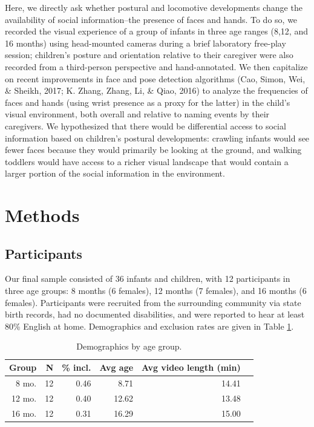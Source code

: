 \documentclass[10pt, letterpaper]{article}
\begin{document}
Here, we directly ask whether postural and locomotive developments
change the availability of social information--the presence of faces and
hands. To do so, we recorded the visual experience of a group of infants
in three age ranges (8,12, and 16 months) using head-mounted cameras
during a brief laboratory free-play session; children's posture and
orientation relative to their caregiver were also recorded from a
third-person perspective and hand-annotated. We then capitalize on
recent improvements in face and pose detection algorithms (Cao, Simon,
Wei, \& Sheikh, 2017; K. Zhang, Zhang, Li, \& Qiao, 2016) to analyze the
frequencies of faces and hands (using wrist presence as a proxy for the
latter) in the child's visual environment, both overall and relative to
naming events by their caregivers. We hypothesized that there would be
differential access to social information based on children's postural
developments: crawling infants would see fewer faces because they would
primarily be looking at the ground, and walking toddlers would have
access to a richer visual landscape that would contain a larger portion
of the social information in the environment.

\section{Methods}\label{methods}

\subsection{Participants}\label{participants}

Our final sample consisted of 36 infants and children, with 12
participants in three age groups: 8 months (6 females), 12 months (7
females), and 16 months (6 females). Participants were recruited from
the surrounding community via state birth records, had no documented
disabilities, and were reported to hear at least 80\% English at home.
Demographics and exclusion rates are given in Table \ref{tab:pop}.

\begin{table}[H]
\centering
\begin{tabular}{rrrrrr}
  \hline
 Group & N & \% incl. & Avg age & Avg video length (min) \\ 
  \hline
   8 mo. &   12 & 0.46 & 8.71 & 14.41 \\ 
   12 mo. &  12 & 0.40 & 12.62 & 13.48 \\ 
   16 mo. &  12 & 0.31 & 16.29 & 15.00\\ 
   \hline
\end{tabular}
\caption{\label{tab:pop} Demographics by age group.}
\end{table}
\end{document}
